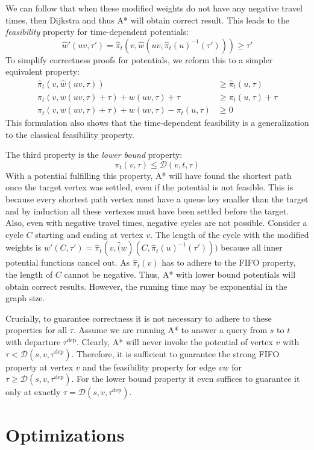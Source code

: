 \documentclass[a4paper,UKenglish,cleveref, autoref, thm-restate,anonymous]{lipics-v2021}
\newcommand*{\dist}{\mathcal{D}}
\newcommand*{\tdep}{\tau^{\operatorname{dep}}}
\begin{document}
We can follow that when these modified weights do not have any negative travel times, then Dijkstra and thus A* will obtain correct result. %
This leads to the \emph{feasibility} property for time-dependent potentials:
\[
\hat{w}'(uv, \tau') = \hat{\pi}_t(v, \hat{w}(uv, \hat{\pi}_t(u)^{-1}(\tau'))) \geq \tau'
\]
To simplify correctness proofs for potentials, we reform this to a simpler equivalent property:
\begin{align*}
\hat{\pi}_t(v, \hat{w}(uv, \tau)) & \geq \hat{\pi}_t(u, \tau) \\
\pi_t(v, w(uv, \tau) + \tau) + w(uv, \tau) + \tau & \geq \pi_t(u, \tau) + \tau \\
\pi_t(v, w(uv, \tau) + \tau) + w(uv, \tau) - \pi_t(u, \tau) & \geq 0
\end{align*}
This formulation also shows that the time-dependent feasibility is a generalization to the classical feasibility property.

The third property is the \emph{lower bound} property:
\[
\pi_t(v, \tau) \leq \dist(v,t,\tau)
\]
With a potential fulfilling this property, A* will have found the shortest path once the target vertex was settled, even if the potential is not feasible.
This is because every shortest path vertex must have a queue key smaller than the target and by induction all these vertexes must have been settled before the target.
Also, even with negative travel times, negative cycles are not possible.
Consider a cycle $C$ starting and ending at vertex $v$.
The length of the cycle with the modified weights is $w'(C, \tau') = \hat{\pi}_t(v, \hat(w)(C, \hat{\pi}_t(u)^{-1}(\tau')))$ because all inner potential functions cancel out.
As $\hat{\pi}_t(v)$ has to adhere to the FIFO property, the length of $C$ cannot be negative.
Thus, A* with lower bound potentials will obtain correct results.
However, the running time may be exponential in the graph size.

Crucially, to guarantee correctness it is not necessary to adhere to these properties for all $\tau$.
Assume we are running A* to answer a query from $s$ to $t$ with departure $\tdep$.
Clearly, A* will never invoke the potential of vertex $v$ with $\tau < \dist(s,v,\tdep)$.
Therefore, it is sufficient to guarantee the strong FIFO property at vertex $v$ and the feasibility property for edge $vw$ for $\tau \geq \dist(s,v,\tdep)$.
For the lower bound property it even suffices to guarantee it only at exactly $\tau = \dist(s,v,\tdep)$.

\section{Optimizations}\label{sec:appendix:optimizations}
\end{document}
